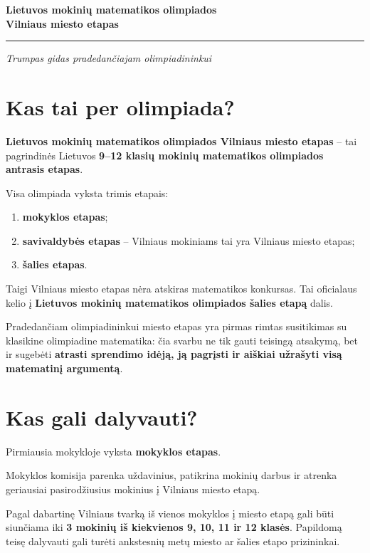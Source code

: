 \documentclass[11pt,a4paper]{article}
\begin{document}
\begin{center}
  {\LARGE\bfseries\color{titleblue} Lietuvos mokinių matematikos olimpiados\\[2pt]
  Vilniaus miesto etapas}\par
  \vspace{0.35em}
  {\color{ruleblue}\rule{0.92\textwidth}{0.8pt}}\par
  \vspace{0.45em}
  {\itshape Trumpas gidas pradedančiajam olimpiadininkui}
\end{center}

\section{Kas tai per olimpiada?}

\textbf{Lietuvos mokinių matematikos olimpiados Vilniaus miesto etapas} -- tai pagrindinės Lietuvos \textbf{9--12 klasių mokinių matematikos olimpiados antrasis etapas}.

Visa olimpiada vyksta trimis etapais:
\begin{enumerate}
  \item \textbf{mokyklos etapas};
  \item \textbf{savivaldybės etapas} -- Vilniaus mokiniams tai yra Vilniaus miesto etapas;
  \item \textbf{šalies etapas}.
\end{enumerate}

Taigi Vilniaus miesto etapas nėra atskiras matematikos konkursas. Tai oficialaus kelio į \textbf{Lietuvos mokinių matematikos olimpiados šalies etapą} dalis.

Pradedančiam olimpiadininkui miesto etapas yra pirmas rimtas susitikimas su klasikine olimpiadine matematika: čia svarbu ne tik gauti teisingą atsakymą, bet ir sugebėti \textbf{atrasti sprendimo idėją, ją pagrįsti ir aiškiai užrašyti visą matematinį argumentą}.

\section{Kas gali dalyvauti?}

Pirmiausia mokykloje vyksta \textbf{mokyklos etapas}.

Mokyklos komisija parenka uždavinius, patikrina mokinių darbus ir atrenka geriausiai pasirodžiusius mokinius į Vilniaus miesto etapą.

Pagal dabartinę Vilniaus tvarką iš vienos mokyklos į miesto etapą gali būti siunčiama iki \textbf{3 mokinių iš kiekvienos 9, 10, 11 ir 12 klasės}. Papildomą teisę dalyvauti gali turėti ankstesnių metų miesto ar šalies etapo prizininkai.
\end{document}
